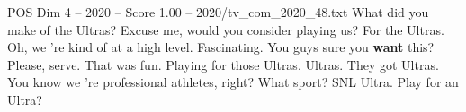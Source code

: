 \begin{textsample}{POS Dim 4 – 2020 – Score 1.00 – 2020/tv\_com\_2020\_48.txt}  \label{ex:f4_pos_046}
What did you make of the Ultras?
Excuse me, would you consider playing us?
For the Ultras.
Oh, we 're kind of at a high level.
Fascinating.
You guys sure you \textbf{want} this?
Please, serve.
That was fun.
Playing for those Ultras.
Ultras.
They got Ultras.
You know we 're professional athletes, right?
What sport?
SNL Ultra.
Play for an Ultra?

\end{textsample}
